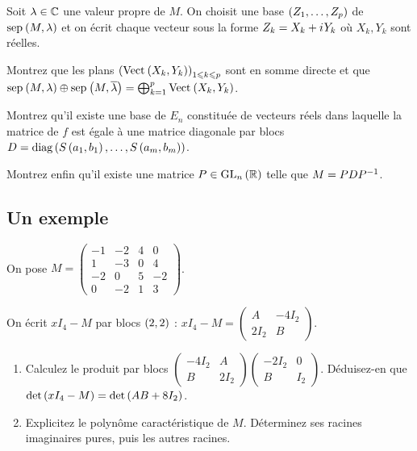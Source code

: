 \begin{q}
Soit \(\lambda\in\mathbb{C}\) une valeur propre de \(M\). On choisit une base \(\left(Z_1,\dots,Z_p\right)\) de \(\sep{M}{\lambda}\) et on écrit chaque vecteur sous la forme \(Z_k=X_k+i\mkern1mu Y_k\) où \(X_k,Y_k\) sont réelles.

Montrez que les plans \(\paren{\Vect{X_k,Y_k}}_{1\leq k\leq p}\) sont en somme directe et que \(\sep{M}{\lambda}\oplus\sep{M}{\conj{\lambda}}=\bigoplus_{k=1}^p\Vect{X_k,Y_k}\).
\end{q}



\begin{q}
Montrez qu'il existe une base de \(E_n\) constituée de vecteurs réels dans laquelle la matrice de \(f\) est égale à une matrice diagonale par blocs \(D=\operatorname{diag}\left(S\left(a_1,b_1\right),\dots,S\left(a_m,b_m\right)\right)\).

Montrez enfin qu'il existe une matrice \(P\in\GL{n}[\R]\) telle que \(M=PDP^{-1}\).
\end{q}



\subsection*{Un exemple}

On pose \(M=\begin{pmatrix}
-1 & -2 & 4 & 0 \\
1 & -3 & 0 & 4 \\
-2 & 0 & 5 & -2 \\
0 & -2 & 1 & 3
\end{pmatrix}\).

\begin{q}
On écrit \(xI_4-M\) par blocs \(\left(2,2\right)\) : \(xI_4-M=\begin{pmatrix}
A & -4I_2 \\
2I_2 & B
\end{pmatrix}\).

\begin{enumerate}
    \item Calculez le produit par blocs \(\begin{pmatrix}-4I_2 & A \\ B & 2I_2\end{pmatrix}\begin{pmatrix}-2I_2 & 0 \\ B & I_2\end{pmatrix}\). Déduisez-en que \(\det\left(xI_4-M\right)=\det\left(AB+8I_2\right)\). \\
    \item Explicitez le polynôme caractéristique de \(M\). Déterminez ses racines imaginaires pures, puis les autres racines.
\end{enumerate}
\end{q}



